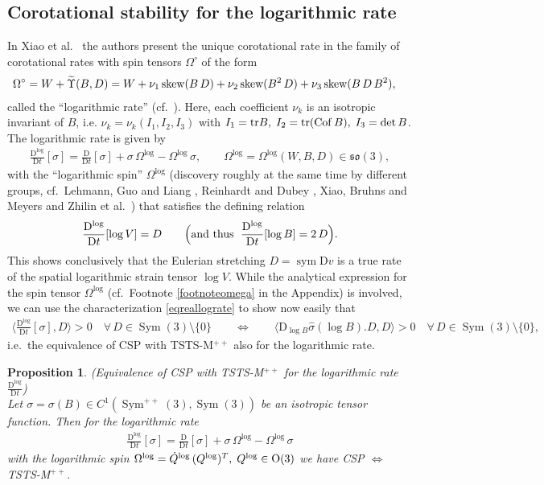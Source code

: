 \documentclass[10pt]{article}
\newcounter{theoremCounter}
\numberwithin{theoremCounter}{section}
\theoremstyle{plain}
\newtheorem{prop}[theoremCounter]{Proposition}
\theoremstyle{definition}
\newcommand{\OO}{{\rm O}}
\newcommand{\DD}{\mathrm{D}}
\DeclareMathOperator{\Sym}{Sym}
\DeclareMathOperator{\Cof}{Cof}
\DeclareMathOperator{\sym}{sym}
\DeclareMathOperator{\tr}{tr}
\def\tr{\textnormal{tr}}
\def\sk{\textnormal{skew}}
\numberwithin{equation}{section}
\begin{document}
\subsection{Corotational stability for the logarithmic rate} \label{corotationalstablog}
%
In Xiao et al.~\cite{xiao97_2, xiao97, xiao98_2, xiao98_1} the authors present the unique corotational rate in the family of corotational rates with spin tensors $\Omega^{\circ}$ of the form
	\begin{align}
	\label{eqmatspin11}
	\Omega^{\circ} &= W + \widetilde \Upsilon(B,D) = W + \nu_1 \, \sk(B \, D) + \nu_2 \, \sk(B^2 \, D) + \nu_3 \, \sk(B \, D \, B^2),
	\end{align}
called the ``logarithmic rate'' (cf.~\cite{Zhilin2013}). Here, each coefficient $\nu_k$ is an isotropic invariant of $B$, i.e. \break $\nu_k = \nu_k(I_1, I_2, I_3)$ with $I_1 = \tr B, \; I_2 = \tr(\Cof B), \; I_3 = \det B$. The logarithmic rate is given by
	\begin{align}
	\frac{\DD^{\log}}{\DD t}[\sigma] = \frac{\DD}{\DD t}[\sigma] + \sigma \, \Omega^{\log} - \Omega^{\log} \, \sigma, \qquad \Omega^{\log} = \Omega^{\log}(W, B,D) \in \mathfrak{so}(3),
	\end{align}
with the ``logarithmic spin'' $\Omega^{\log}$ (discovery roughly at the same time by different groups, cf.~Lehmann, Guo and Liang \cite{lehmann1991}, Reinhardt and Dubey \cite{reinhardt1996}, Xiao, Bruhns and Meyers \cite{xiao98_2} and Zhilin et al.~\cite{Zhilin2013}) that satisfies the defining relation
	\begin{align}
	\label{eqreallograte}
	\frac{\DD^{\log}}{\DD t}[\log V] = D \qquad \Bigl(\textnormal{and thus }\; \frac{\DD^{\log}}{\DD t}[\log B] = 2 \, D \Bigr).
	\end{align}
This shows conclusively that the Eulerian stretching $D = \sym \DD v$ is a true rate of the spatial logarithmic strain tensor $\log V$. While the analytical expression for the spin tensor $\Omega^{\log}$ (cf.~Footnote \ref{footnoteomega} in the Appendix) is involved, we can use the characterization \eqref{eqreallograte} to show now easily that
	\begin{align}
	\langle \frac{\DD^{\log}}{\DD t}[\sigma], D \rangle > 0 \quad \forall \, D \in \Sym(3) \! \setminus \! \{0\} \qquad \iff \qquad \langle \DD_{\log B} \widehat \sigma(\log B). D, D \rangle > 0 \quad \forall \, D \in \Sym(3) \! \setminus \! \{0\},
	\end{align}
i.e.~the equivalence of CSP with TSTS-M$^{++}$ also for the logarithmic rate. 
%
\begin{prop}(Equivalence of CSP with TSTS-M$^{++}$ for the logarithmic rate $\frac{\DD^{\log}}{\DD t}$) \label{proplograte}\\
Let $\sigma = \sigma(B) \in C^1(\Sym^{++}(3), \Sym(3))$ be an isotropic tensor function. Then for the logarithmic rate
	\begin{align}
	\frac{\DD^{\log}}{\DD t}[\sigma] = \frac{\DD}{\DD t}[\sigma] + \sigma \, \Omega^{\log} - \Omega^{\log} \, \sigma
	\end{align}
with the logarithmic spin $\Omega^{\log} = \dot Q^{\log} \, (Q^{\log})^T, \; Q^{\log} \in \OO(3)$ we have CSP $\iff$ TSTS-M$^{++}$.
\end{prop}
\end{document}
